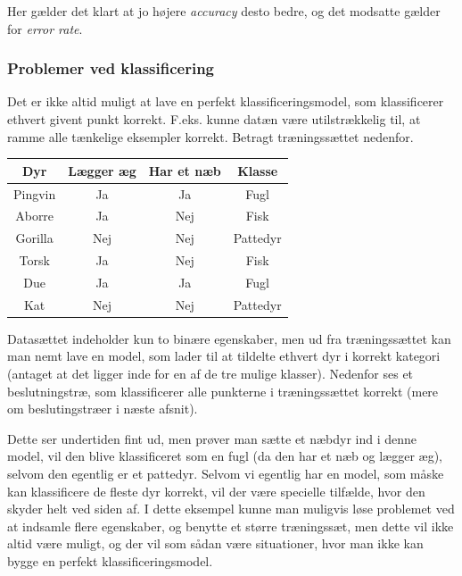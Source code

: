 \documentclass{article}
\begin{document}
Her gælder det klart at jo højere \textit{accuracy} desto bedre, og det modsatte gælder for \textit{error rate}. \\

\subsubsection{Problemer ved klassificering}
Det er ikke altid muligt at lave en perfekt klassificeringsmodel, som klassificerer ethvert givent punkt korrekt. F.eks. kunne datæn være utilstrækkelig til, at ramme alle tænkelige eksempler korrekt. Betragt træningssættet nedenfor. 

\begin{tabular}{c|c|c|c}
	Dyr & Lægger æg & Har et næb & Klasse\\
	\hline
	Pingvin & Ja & Ja & Fugl\\
	Aborre & Ja & Nej & Fisk\\
	Gorilla & Nej & Nej & Pattedyr\\
	Torsk & Ja & Nej & Fisk\\
	Due & Ja & Ja & Fugl\\
	Kat & Nej & Nej & Pattedyr
\end{tabular}

Datasættet indeholder kun to binære egenskaber, men ud fra træningssættet kan man nemt lave en model, som lader til at tildelte ethvert dyr i korrekt kategori (antaget at det ligger inde for en af de tre mulige klasser). Nedenfor ses et beslutningstræ, som klassificerer alle punkterne i træningssættet korrekt (mere om beslutingstræer i næste afsnit).

\begin{center}
\end{center}
Dette ser undertiden fint ud, men prøver man sætte et næbdyr ind i denne model, vil den blive klassificeret som en fugl (da den har et næb og lægger æg), selvom den egentlig er et pattedyr. Selvom vi egentlig har en model, som måske kan klassificere de fleste dyr korrekt, vil der være specielle tilfælde, hvor den skyder helt ved siden af. I dette eksempel kunne man muligvis løse problemet ved at indsamle flere egenskaber, og benytte et større træningssæt, men dette vil ikke altid være muligt, og der vil som sådan være situationer, hvor man ikke kan bygge en perfekt klassificeringsmodel.
\end{document}
